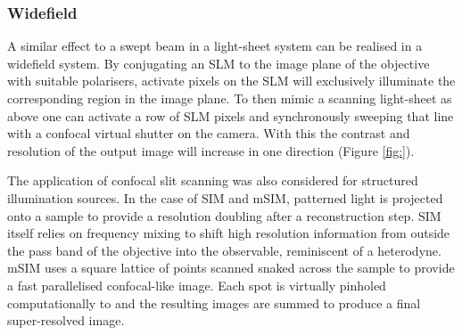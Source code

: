 \subsubsection{Widefield}

A similar effect to a swept beam in a light-sheet system can be realised in a widefield system.
By conjugating an SLM to the image plane of the objective with suitable polarisers, activate pixels on the SLM will exclusively illuminate the corresponding region in the image plane.
To then mimic a scanning light-sheet as above one can activate a row of SLM pixels and synchronously sweeping that line with a confocal virtual shutter on the camera.
With this the contrast and resolution of the output image will increase in one direction (Figure \ref{fig:}).

The application of confocal slit scanning was also considered for structured illumination sources.
In the case of SIM and mSIM, patterned light is projected onto a sample to provide a resolution doubling after a reconstruction step.
SIM itself relies on frequency mixing to shift high resolution information from outside the pass band of the objective into the observable, reminiscent of a heterodyne.
mSIM uses a square lattice of points scanned snaked across the sample to provide a fast parallelised confocal-like image.
Each spot is virtually pinholed computationally to and the resulting images are summed to produce a final super-resolved image.

